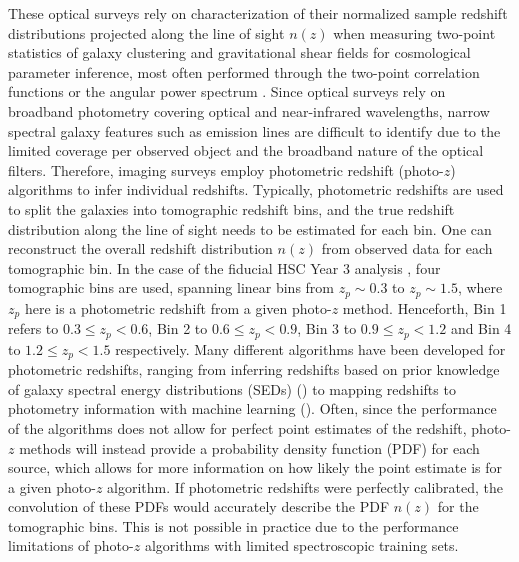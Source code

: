 These optical surveys rely on characterization of their normalized sample redshift distributions projected along the line of sight $n(z)$ when measuring two-point statistics of galaxy clustering and gravitational shear fields for cosmological parameter inference, most often performed through the two-point correlation functions \cite{CosmoShearLi2023HSCY3} or the angular power spectrum \cite{Dalal2023CosmoShearHSC}. Since optical surveys rely on broadband photometry covering optical and near-infrared wavelengths, narrow spectral galaxy features such as emission lines are difficult to identify due to the limited coverage per observed object and the broadband nature of the optical filters. Therefore, imaging surveys employ photometric redshift (photo-$z$) algorithms to infer individual redshifts. Typically, photometric redshifts are used to split the galaxies into tomographic redshift bins, and the true redshift distribution along the line of sight needs to be estimated for each bin. 
One can reconstruct the overall redshift distribution $n(z)$ from observed data for each tomographic bin. In the case of the fiducial HSC Year 3 analysis \cite{HSCClusteringRau2023, CosmoShearLi2023HSCY3, Dalal2023CosmoShearHSC}, four tomographic bins are used, spanning linear bins from $z_p\sim0.3$ to $z_p\sim1.5$, where $z_p$ here is a photometric redshift from a given photo-$z$ method. Henceforth, Bin 1 refers to $0.3\leq z_p<0.6$, Bin 2 to $0.6\leq z_p<0.9$, Bin 3 to $0.9\leq z_p<1.2$ and Bin 4 to $1.2\leq z_p<1.5$ respectively. 
Many different algorithms have been developed for photometric redshifts, ranging from inferring redshifts based on prior knowledge of galaxy spectral energy distributions (SEDs) (\cite{LePhare1, LePhare2, Brammer2008EAZY, MizukiHSCTanaka2015}) to mapping redshifts to photometry information with machine learning (\cite{CarrascoKind2014PhotozMLz, Hsieh2014DEMp, Collister2004ANNz}). Often, since the performance of the algorithms does not allow for perfect point estimates of the redshift, photo-$z$ methods will instead provide a probability density function (PDF) for each source, which allows for more information on how likely the point estimate is for a given photo-$z$ algorithm. If photometric redshifts were perfectly calibrated, the convolution of these PDFs would accurately describe the PDF $n(z)$ for the tomographic bins. This is not possible in practice due to the performance limitations of photo-$z$ algorithms with limited spectroscopic training sets. 

